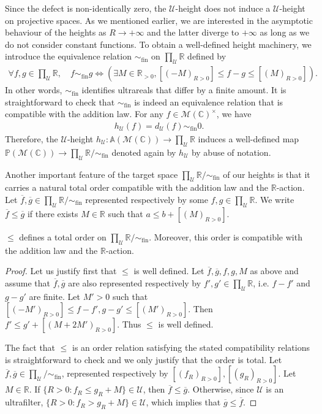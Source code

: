 \documentclass [11pt,reqno]{amsart}
\def\bC{{\mathbb{C}}}
\def\bR{{\mathbb{R}}}
\newcommand{\1}{\mathmybb{1}}
\def\cM{{\mathcal{M}}}
\def\cU{{\mathcal{U}}}
\def\fin{\mathrm{fin}}
\begin{document}
Since the defect is non-identically zero, the $\cU$-height does not induce a $\cU$-height on projective spaces. As we mentioned earlier, we are interested in the asymptotic behaviour of the heights as $R\to+\infty$ and the latter diverge to $+\infty$ as long as we do not consider constant functions. To obtain a well-defined height machinery, we introduce the equivalence relation $\sim_{\fin}$ on $\prod_{\cU}\bR$ defined by
\begin{align*}
\forall f,g\in \displaystyle\prod_{\cU}\bR, \quad f\sim_{\fin}g \Leftrightarrow \left(\exists M\in \bR_{>0}, [(-M)_{R>0}]\leq f-g\leq [(M)_{R>0}]\right).
\end{align*}
In other words, $\sim_{\fin}$ identifies ultrareals that differ by a finite amount. It is straightforward to check that $\sim_{\fin}$ is indeed an equivalence relation that is compatible with the addition law. For any $f\in \cM(\bC)^{\times}$, we have
\begin{align*}
h_{\cU}(f)=d_{\cU}(f)\sim_{\fin} 0.
\end{align*}
Therefore, the $\cU$-height $h_{\cU}:\mathbb{A}(\cM(\bC))\to\prod_{\cU}\bR$ induces a well-defined map $\mathbb{P}(\cM(\bC))\to\prod_{\cU}\bR/\sim_{\fin}$ denoted again by $h_{\cU}$ by abuse of notation. 

Another important feature of the target space $\prod_{\cU}\bR/\sim_{\fin}$ of our heights is that it carries a natural total order compatible with the addition law and the $\bR$-action. Let $\overline{f},\overline{g}\in \prod_{\cU}\bR/\sim_{\fin}$ represented respectively by some $f,g\in\prod_{\cU}\bR$. We write $\overline{f}\leq \overline{g}$ if there exists $M\in \bR$ such that $a\leq b + [(M)_{R>0}]$.

\begin{claim}
\label{claim:total_order_target_height}
$\leq$ defines a total order on $\prod_{\cU}\bR/\sim_{\fin}$. Moreover, this order is compatible with the addition law and the $\bR$-action.
\end{claim}

\begin{proof}
Let us justify first that $\leq$ is well defined. Let $\overline{f},\overline{g},f,g,M$ as above and assume that $\overline{f},\overline{g}$ are also represented respectively by $f',g'\in\prod_{\cU}\bR$, i.e. $f-f'$ and $g-g'$ are finite. Let $M'>0$ such that $[(-M')_{R>0}]\leq f-f',g-g'\leq [(M')_{R>0}]$. Then $f'\leq g'+[(M+2M')_{R>0}]$. Thus $\leq$ is well defined. 

The fact that $\leq$ is an order relation satisfying the stated compatibility relations is straightforward to check and we only justify that the order is total. Let $\overline{f},\overline{g}\in \prod_{\cU}/\sim_{\fin}$, represented respectively by $[(f_{R})_{R>0}],[(g_{R})_{R>0}]$. Let $M\in \bR$. If $\{R>0:f_{R}\leq g_{R}+M\}\in \cU$, then $\overline{f}\leq\overline{g}$. Otherwise, since $\cU$ is an ultrafilter, $\{R>0:f_{R}> g_{R}+M\}\in \cU$, which implies that $\overline{g}\leq \overline{f}$.
\end{proof}
\end{document}
